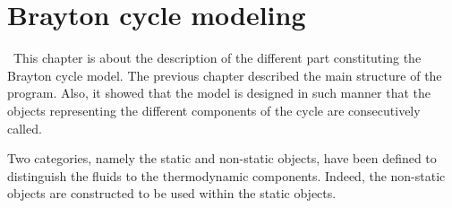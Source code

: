 \graphicspath{{Chapitre_6/Images/}}
\chapter{Brayton cycle modeling}\label{C6}
\quad\, This chapter is about the description of the different part constituting the Brayton cycle model. The previous chapter described the main structure of the program. Also, it showed that the model is designed in such manner that the objects representing the different components of the cycle are consecutively called. 

Two categories, namely the static and non-static objects, have been defined to distinguish the fluids to the thermodynamic components. Indeed, the non-static objects are constructed to be used within the static objects.




 